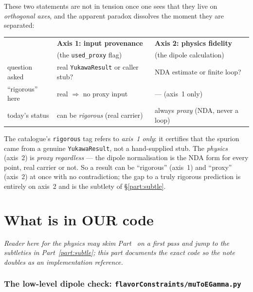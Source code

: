 \documentclass[11pt]{article}
\newcommand{\code}[1]{\texttt{#1}}
\theoremstyle{definition}
\begin{document}
These two statements are not in tension once one sees that they live on
\emph{orthogonal axes}, and the apparent paradox dissolves the moment they are
separated:
\begin{center}
\begin{tabular}{lll}
\toprule
 & \textbf{Axis 1: input provenance} & \textbf{Axis 2: physics fidelity} \\
 & (the \code{used\_proxy} flag) & (the dipole calculation) \\
\midrule
question asked & real \code{YukawaResult} or caller stub? & NDA estimate or finite loop? \\
``rigorous'' here & real $\Rightarrow$ no proxy input & --- (axis~1 only) \\
today's status    & can be \emph{rigorous} (real carrier) & always \emph{proxy} (NDA, never a loop) \\
\bottomrule
\end{tabular}
\end{center}
The catalogue's \code{rigorous} tag refers to \emph{axis~1 only}: it certifies
that the spurion came from a genuine \code{YukawaResult}, not a hand-supplied
stub. The \emph{physics} (axis~2) is \emph{proxy regardless} --- the dipole
normalisation is the NDA form for every point, real carrier or not. So a result
can be ``rigorous'' (axis~1) and ``proxy'' (axis~2) at once with no contradiction;
the gap to a truly rigorous prediction is entirely on axis~2 and is the subtlety
of \S\ref{part:subtle}.

\part{What is in OUR code}
\label{part:code}

\emph{Reader here for the physics may skim Part~\ref{part:code} on a first pass
and jump to the subtleties in Part~\ref{part:subtle}; this part documents the
exact code so the note doubles as an implementation reference.}

\section{The low-level dipole check: \code{flavorConstraints/muToEGamma.py}}
\label{sec:codemuegamma}
\end{document}
